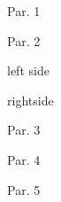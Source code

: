 \documentclass[b5paper]{book}
\begin{document}
\beginnumbering
\numberpstarttrue
\pstart
Par. 1
\pend

\pstart
Par. 2
\pend

\pausenumbering
\begin{pairs}
\begin{Leftside}
\resumenumbering
\numberpstartfalse
	\pstart\noindent left side\pend
\pausenumbering
\end{Leftside}

\begin{Rightside}
\beginnumbering
\numberpstartfalse
	\pstart\noindent rightside\pend
\pausenumbering
\end{Rightside}
\end{pairs}
\Columns

\numberpstarttrue
\resumenumbering

\pstart
Par. 3
\pend


\pstart
Par. 4
\pend

\pstart
Par. 5
\pend

\endnumbering
\end{document}
